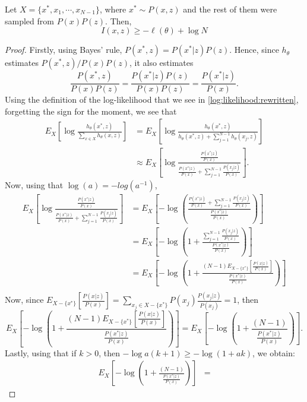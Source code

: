\begin{nprop}\label{Prop:Bound:NCE}
Let $X = \{x^*, x_1,\cdots,x_{N-1} \}$, where $x^* \sim P(x,z)$ and the rest of them were sampled from $P(x)P(z)$. Then,
\begin{equation}\label{Bound:NCE}
I(x,z) \geq -  \ell(\theta) + \log N
\end{equation}
\end{nprop}
\begin{proof}

Firstly, using Bayes' rule, $P(x^*,z) = P(x^*|z)P(z)$. Hence, since $h_\theta$ estimates $P(x^*,z)/P(x)P(z)$, it also estimates
\[
\frac{P(x^*,z)}{P(x)P(z)} = \frac{P(x^*|z)P(z)}{P(x)P(z)} = \frac{P(x^*|z)}{P(x)}.
\]
Using the definition of the log-likelihood that we see in \eqref{log:likelihood:rewritten}, forgetting the sign for the moment, we see that
\begin{align*}
E_X \left[ \log \frac{h_\theta(x^*,z)}{\sum_{x \in X}h_\theta(x,z)}\right] & =  E_X \left[ \log \frac{h_\theta(x^*,z)}{ h_\theta(x^*,z) + \sum_{j = 1}^{N-1} h_\theta(x_j,z)}\right] \\
& \approx E_X \left[ \log \frac{\frac{P(x^*|z)}{P(x)}}{ \frac{P(x^*|z)}{P(x)} + \sum_{j = 1}^{N-1} \frac{P(x_j|z)}{P(x)}}\right].
\end{align*}
Now, using that $\log(a) = -log(a^{-1})$,
\begin{align*}
E_X \left[ \log \frac{\frac{P(x^*|z)}{P(x)}}{ \frac{P(x^*|z)}{P(x)} + \sum_{j = 1}^{N-1} \frac{P(x_j|z)}{P(x)}}\right] & = E_X\left[ -\log\left( \frac{\frac{P(x^*|z)}{P(x)} + \sum_{j = 1}^{N-1} \frac{P(x_j|z)}{P(x)}}{\frac{P(x^*|z)}{P(x)}}\right) \right] \\
& = E_X\left[ -\log\left( 1+ \frac{ \sum_{j = 1}^{N-1} \frac{P(x_j|z)}{P(x)}}{\frac{P(x^*|z)}{P(x)}} \right) \right] \\
& = E_X\left[ -\log\left( 1+ \frac{ (N-1) E_{X - \{x^*\}}\left[\frac{P(x|z)}{P(x)}\right] }{\frac{P(x^*|z)}{P(x)}}\right)\right] \\
\end{align*}
Now, since $E_{X - \{x^*\}} \left[ \frac{P(x|z)}{P(x)} \right] = \sum_{x_j \in X - \{x^*\}} P(x_j) \frac{P(x_j|z)}{P(x_j)} = 1$, then
\[
E_X\left[ -\log\left( 1+ \frac{ (N-1) E_{X - \{x^*\}}\left[\frac{P(x|z)}{P(x)}\right] }{\frac{P(x^*|z)}{P(x)}}\right)\right]  
= E_X\left[ -\log\left( 1+ \frac{ (N-1)}{\frac{P(x^*|z)}{P(x)}} \right)\right].
\] 
Lastly, using that if $k > 0$, then $- \log a(k+1) \geq -\log(1+ak)$, we obtain:
\begin{align*}
E_X\left[ -\log\left( 1+ \frac{ (N-1)}{\frac{P(x^*|z)} {P(x)}} \right)\right] &  =

\end{align*}
\end{proof}

